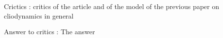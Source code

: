 \documentclass{beamer}
\begin{document}
\begin{frame}{Crictics}
    \cite{thomas_does_2014} : critics of the article and
    of the model of the previous paper
    on cliodynamics in general
\end{frame}

\begin{frame}{Answer to critics}
    \cite{turchin_reply_2014}: The answer
\end{frame}



\end{document}
